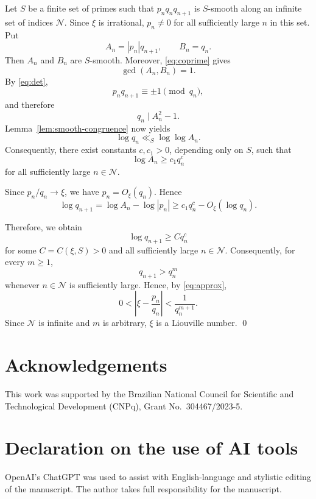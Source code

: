 \documentclass[11pt]{amsart}
\theoremstyle{remark}
\begin{document}
Let $S$ be a finite set of primes such that $p_nq_nq_{n+1}$ is
$S$-smooth along an infinite set of indices $\mathcal N$. Since $\xi$ is irrational,
$p_n\ne0$ for all sufficiently large $n$ in this set. Put
\[
 A_n=|p_n|q_{n+1},
 \qquad
 B_n=q_n.
\]
Then $A_n$ and $B_n$ are $S$-smooth. Moreover,
\eqref{eq:coprime} gives
\[
 \gcd(A_n,B_n)=1.
\]
By \eqref{eq:det},
\[
 p_nq_{n+1}\equiv\pm1\pmod{q_n},
\]
and therefore
\begin{equation}\label{eq:central-congruence}
 q_n\mid A_n^2-1.
\end{equation}
Lemma~\ref{lem:smooth-congruence} now yields
\begin{equation}\label{eq:logqn-loglogA}
 \log q_n\ll_S\log\log A_n.
\end{equation}
Consequently, there exist constants $c,c_1>0$, depending only on $S$,
such that
\begin{equation}\label{eq:logA-power}
 \log A_n\ge c_1q_n^c
\end{equation}
for all sufficiently large $n\in\mathcal N$.

Since $p_n/q_n\to\xi$, we have $p_n=O_{\xi}(q_n)$. Hence
\[
 \log q_{n+1}
 =\log A_n-\log|p_n|
 \ge c_1q_n^c-O_\xi(\log q_n).
\]

Therefore, we obtain
\begin{equation}\label{eq:quant}
 \log q_{n+1}\ge Cq_n^c
\end{equation}
for some $C=C(\xi,S)>0$ and all sufficiently large $n\in\mathcal N$.
Consequently, for every $m\ge1$,
\[
 q_{n+1}>q_n^m
\]
whenever $n\in\mathcal N$ is sufficiently large. Hence, by
\eqref{eq:approx},
\[
 0<
 \left|\xi-\frac{p_n}{q_n}\right|
 <
 \frac{1}{q_n^{m+1}}.
\]
Since $\mathcal N$ is infinite and $m$ is arbitrary, $\xi$ is a
Liouville number.
\qed


\section*{Acknowledgements}

This work was supported by the Brazilian National Council for Scientific and Technological Development (CNPq), Grant No.~304467/2023-5.


\section*{Declaration on the use of AI tools}
OpenAI's ChatGPT was used to assist
with English-language and stylistic editing of the manuscript. The author takes full responsibility for the manuscript.
\end{document}

